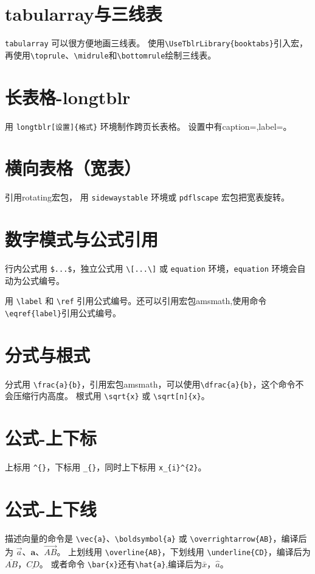 \documentclass[12pt,a4paper]{ctexart}
\begin{document}
\section{tabularray与三线表}
\verb|tabularray| 可以很方便地画三线表。
使用\verb|\UseTblrLibrary{booktabs}|引入宏，再使用\verb|\toprule|、\verb|\midrule|和\verb|\bottomrule|绘制三线表。

\section{长表格-longtblr}
用 \verb|longtblr[设置]{格式}| 环境制作跨页长表格。
设置中有caption={},label={}。

\section{横向表格（宽表）}
引用rotating宏包，
用 \verb|sidewaystable| 环境或 \verb|pdflscape| 宏包把宽表旋转。



\section{数字模式与公式引用}
行内公式用 \verb|$...$|，独立公式用 \verb|\[...\]| 或 \verb|equation| 环境，\verb|equation| 环境会自动为公式编号。

用 \verb|\label| 和 \verb|\ref| 引用公式编号。还可以引用宏包amsmath,使用命令\\
\verb|\eqref{label}|引用公式编号。

\section{分式与根式}
分式用 \verb|\frac{a}{b}|，引用宏包amsmath，可以使用\verb|\dfrac{a}{b}|，这个命令不会压缩行内高度。
根式用 \verb|\sqrt{x}| 或 \verb|\sqrt[n]{x}|。

\section{公式-上下标}
上标用 \verb|^{}|，下标用 \verb|_{}|，同时上下标用 \verb|x_{i}^{2}|。

\section{公式-上下线}
描述向量的命令是 \verb|\vec{a}|、\verb|\boldsymbol{a}| 或 \verb|\overrightarrow{AB}|，编译后为
$\vec{a}$、$\boldsymbol{a}$、$\overrightarrow{AB}$。
上划线用 \verb|\overline{AB}|，下划线用 \verb|\underline{CD}|，编译后为$\overline{AB}$，$\underline{CD}$。
或者命令 \verb|\bar{x}|还有\verb|\hat{a}|,编译后为$\bar{x}$，$\hat{a}$。
\end{document}
